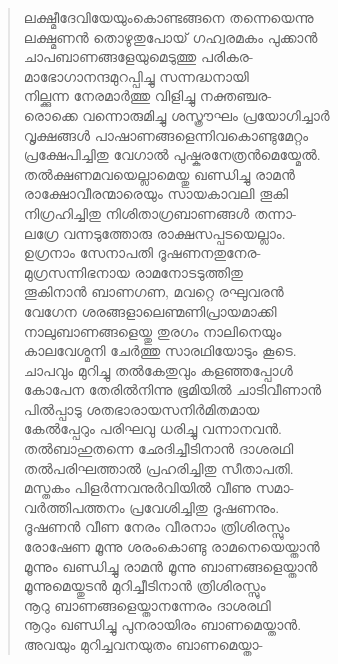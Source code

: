 \begin{verse}
ലക്ഷ്മീദേവിയേയുംകൊണ്ടങ്ങനെ തന്നെയെന്നു\\
ലക്ഷ്മണന്‍ തൊഴുതുപോയ് ഗഹ്വരമകം പുക്കാന്‍\\
ചാപബാണങ്ങളേയുമെടുത്തു പരികര-\\
മാഭോഗാനന്ദമുറപ്പിച്ചു സന്നദ്ധനായി\\
നില്ക്കുന്ന നേരമാര്‍ത്തു വിളിച്ചു നക്തഞ്ചര-\\
രൊക്കെ വന്നൊരുമിച്ചു ശസ്ത്രൗഘം പ്രയോഗിച്ചാര്‍\\
വൃക്ഷങ്ങള്‍ പാഷാണങ്ങളെന്നിവകൊണ്ടുമേറ്റം\\
പ്രക്ഷേപിച്ചിതു വേഗാല്‍ പുഷ്കരനേത്രന്‍മെയ്മേല്‍.\\
തല്‍ക്ഷണമവയെല്ലാമെയ്തു ഖണ്ഡിച്ചു രാമന്‍\\
രാക്ഷോവീരന്മാരെയും സായകാവലി തൂകി\\
നിഗ്രഹിച്ചിതു നിശിതാഗ്രബാണങ്ങള്‍ തന്നാ-\\
ലഗ്രേ വന്നടുത്തോരു രാക്ഷസപ്പടയെല്ലാം.\\
ഉഗ്രനാം സേനാപതി ദൂഷണനതുനേര-\\
മുഗ്രസന്നിഭനായ രാമനോടടുത്തിതു\\
തൂകിനാന്‍ ബാണഗണ, മവറ്റെ രഘുവരന്‍\\
വേഗേന ശരങ്ങളാലെണ്മണിപ്രായമാക്കി\\
നാലുബാണങ്ങളെയ്തു തുരഗം നാലിനെയും\\
കാലവേശ്മനി ചേര്‍ത്തു സാരഥിയോടും കൂടെ.\\
ചാപവും മുറിച്ചു തല്‍കേതുവും കളഞ്ഞപ്പോള്‍\\
കോപേന തേരില്‍നിന്നു ഭൂമിയില്‍ ചാടിവീണാന്‍\\
പില്‍പ്പാടു ശതഭാരായസനിര്‍മിതമായ\\
കേല്‍പ്പേറും പരിഘവു ധരിച്ചു വന്നാനവന്‍.\\
തല്‍ബാഹുതന്നെ ഛേദിച്ചീടിനാന്‍ ദാശരഥി\\
തല്‍പരിഘത്താല്‍ പ്രഹരിച്ചിതു സീതാപതി.\\
മസ്തകം പിളര്‍ന്നവനുര്‍വിയില്‍ വീണു സമാ-\\
വര്‍ത്തിപത്തനം പ്രവേശിച്ചിതു ദൂഷണനും.\\
ദൂഷണന്‍ വീണ നേരം വീരനാം ത്രിശിരസ്സും\\
രോഷേണ മൂന്നു ശരംകൊണ്ടു രാമനെയെയ്താന്‍\\
മൂന്നും ഖണ്ഡിച്ചു രാമന്‍ മൂന്നു ബാണങ്ങളെയ്താന്‍\\
മൂന്നുമെയ്തുടന്‍ മുറിച്ചീടിനാന്‍ ത്രിശിരസ്സും\\
നൂറു ബാണങ്ങളെയ്താനന്നേരം ദാശരഥി\\
നൂറും ഖണ്ഡിച്ചു പുനരായിരം ബാണമെയ്താന്‍.\\
അവയും മുറിച്ചവനയുതം ബാണമെയ്താ-\\

\end{verse}
